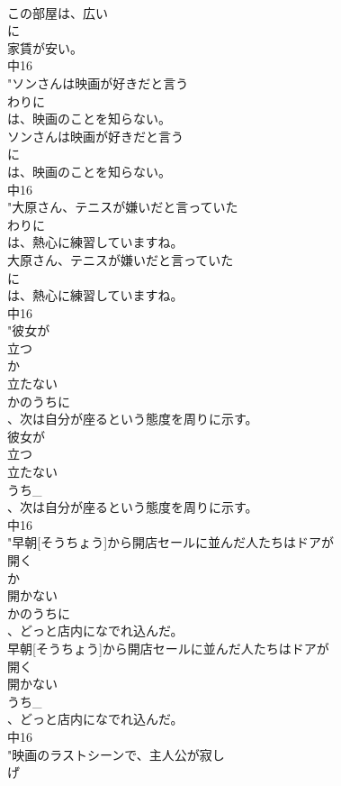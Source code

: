 \documentclass[8pt]{extreport}
\begin{document}
\begin{CJK}{UTF8}{min}
\\	この部屋は、広い
\\	に
\\	家賃が安い。
\\	中16
\\	"ソンさんは映画が好きだと言う
\\	わりに
\\	は、映画のことを知らない。
\\	ソンさんは映画が好きだと言う
\\	に
\\	は、映画のことを知らない。
\\	中16
\\	"大原さん、テニスが嫌いだと言っていた
\\	わりに
\\	は、熱心に練習していますね。
\\	大原さん、テニスが嫌いだと言っていた
\\	に
\\	は、熱心に練習していますね。
\\	中16
\\	"彼女が
\\	立つ
\\	か
\\	立たない
\\	かのうちに
\\	、次は自分が座るという態度を周りに示す。
\\	彼女が
\\	立つ
\\	立たない
\\	うち_
\\	、次は自分が座るという態度を周りに示す。
\\	中16
\\	"早朝[そうちょう]から開店セールに並んだ人たちはドアが
\\	開く
\\	か
\\	開かない
\\	かのうちに
\\	、どっと店内になでれ込んだ。
\\	早朝[そうちょう]から開店セールに並んだ人たちはドアが
\\	開く
\\	開かない
\\	うち_
\\	、どっと店内になでれ込んだ。
\\	中16
\\	"映画のラストシーンで、主人公が寂し
\\	げ

\end{CJK}
\end{document}
